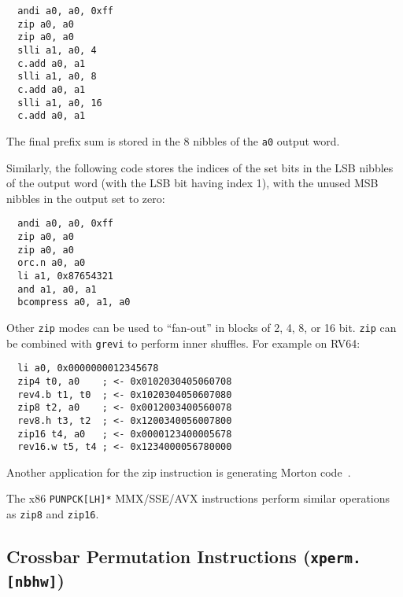 \begin{minipage}{\linewidth}
\begin{verbatim}
  andi a0, a0, 0xff
  zip a0, a0
  zip a0, a0
  slli a1, a0, 4
  c.add a0, a1
  slli a1, a0, 8
  c.add a0, a1
  slli a1, a0, 16
  c.add a0, a1
\end{verbatim}
\end{minipage}

The final prefix sum is stored in the 8 nibbles of the {\tt a0} output word.

Similarly, the following code stores the indices of the set bits in the LSB
nibbles of the output word (with the LSB bit having index 1), with the unused
MSB nibbles in the output set to zero:

\begin{minipage}{\linewidth}
\begin{verbatim}
  andi a0, a0, 0xff
  zip a0, a0
  zip a0, a0
  orc.n a0, a0
  li a1, 0x87654321
  and a1, a0, a1
  bcompress a0, a1, a0
\end{verbatim}
\end{minipage}

Other {\tt zip} modes can be used to ``fan-out'' in blocks of 2, 4, 8, or 16 bit.
{\tt zip} can be combined with {\tt grevi} to perform inner shuffles. For example
on RV64:

\begin{minipage}{\linewidth}
\begin{verbatim}
  li a0, 0x0000000012345678
  zip4 t0, a0    ; <- 0x0102030405060708
  rev4.b t1, t0  ; <- 0x1020304050607080
  zip8 t2, a0    ; <- 0x0012003400560078
  rev8.h t3, t2  ; <- 0x1200340056007800
  zip16 t4, a0   ; <- 0x0000123400005678
  rev16.w t5, t4 ; <- 0x1234000056780000
\end{verbatim}
\end{minipage}

Another application for the zip instruction is generating Morton
code~\cite{MortonCode}.

The x86 {\tt PUNPCK[LH]*} MMX/SSE/AVX instructions perform similar operations
as {\tt zip8} and {\tt zip16}.


\subsection{Crossbar Permutation Instructions (\texttt{xperm.[nbhw]})}

